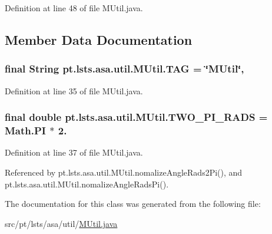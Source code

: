 Definition at line 48 of file M\+Util.\+java.



\subsection{Member Data Documentation}
\hypertarget{classpt_1_1lsts_1_1asa_1_1util_1_1MUtil_aaa7c2f3d287c68af20d3fdbea7d338bc}{}
\subsubsection[{T\+A\+G}]{\setlength{\rightskip}{0pt plus 5cm}final String pt.\+lsts.\+asa.\+util.\+M\+Util.\+T\+A\+G = \char`\"{}M\+Util\char`\"{}\hspace{0.3cm}{\ttfamily [static]}, {\ttfamily [private]}}\label{classpt_1_1lsts_1_1asa_1_1util_1_1MUtil_aaa7c2f3d287c68af20d3fdbea7d338bc}


Definition at line 35 of file M\+Util.\+java.

\hypertarget{classpt_1_1lsts_1_1asa_1_1util_1_1MUtil_a26d21613af5d7dd4eb7106987b409f76}{}
\subsubsection[{T\+W\+O\+\_\+\+P\+I\+\_\+\+R\+A\+D\+S}]{\setlength{\rightskip}{0pt plus 5cm}final double pt.\+lsts.\+asa.\+util.\+M\+Util.\+T\+W\+O\+\_\+\+P\+I\+\_\+\+R\+A\+D\+S = Math.\+P\+I $\ast$ 2.\hspace{0.3cm}{\ttfamily [static]}}\label{classpt_1_1lsts_1_1asa_1_1util_1_1MUtil_a26d21613af5d7dd4eb7106987b409f76}


Definition at line 37 of file M\+Util.\+java.



Referenced by pt.\+lsts.\+asa.\+util.\+M\+Util.\+nomalize\+Angle\+Rads2\+Pi(), and pt.\+lsts.\+asa.\+util.\+M\+Util.\+nomalize\+Angle\+Rads\+Pi().



The documentation for this class was generated from the following file\+:\begin{DoxyCompactItemize}
\item 
src/pt/lsts/asa/util/\hyperlink{MUtil_8java}{M\+Util.\+java}\end{DoxyCompactItemize}
